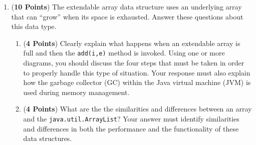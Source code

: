 \documentclass[12pt]{article}
\begin{document}
\begin{enumerate}

 \item ({\bf 10 Points}) The extendable array data structure uses an
  underlying array that can ``grow'' when its space is exhausted.
  Answer these questions about this data type.

  \begin{enumerate}

  \item ({\bf 4 Points}) Clearly explain what happens when an
    extendable array is full and then the {\tt add(i,e)} method is
    invoked. Using one or more diagrams, you should discuss the four
    steps that must be taken in order to properly handle this type of
    situation.  Your response must also explain how the garbage
    collector (GC) within the Java virtual machine (JVM) is used
    during memory management.


  \item ({\bf 4 Points}) What are the the similarities and differences
    between an array and the {\tt java.util.ArrayList}?  Your answer
    must identify similarities and differences in both the performance
    and the functionality of these data structures.




\end{enumerate}
\end{enumerate}
\end{document}
